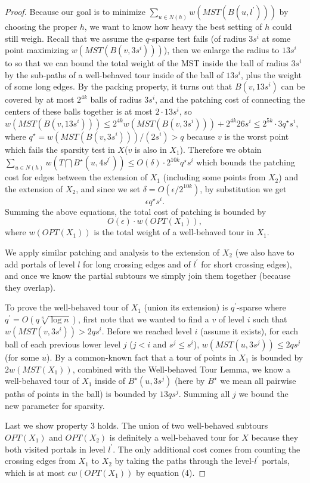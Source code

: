 \documentclass{llncs}
\begin{document}
\begin{proof}
Because our goal is to minimize $\sum_{u\in N(h)}w(MST(B(u,l^\prime)))$ by choosing the proper $h$, we want to know how heavy the best setting of $h$ could still weigh.
Recall that we assume the $q$-sparse test fails (of radius $3s^i$ at some point maximizing $w(MST(B(v,3s^i)))$), then we enlarge the radius to $13s^i$ to so that we can bound the total weight of the MST inside the ball of radius $3s^i$ by the sub-paths of a well-behaved tour inside of the ball of $13s^i$, plus the weight of some long edges.
By the packing property, it turns out that $B(v,13s^i)$ can be covered by at most $2^{4k}$ balls of radius $3s^i$, and the patching cost of connecting the centers of these balls together is at most $2\cdot13s^i$, so $w(MST(B(v,13s^i)))\leq 2^{4k}w(MST(B(v,3s^i)))+2^{4k}26s^i\leq 2^{5k}\cdot 3q^{\star}s^i$, where $q^\star=w(MST(B(v,3s^i)))/(2s^i) > q$ because $v$ is the worst point which fails the sparsity test in $X$($v$ is also in $X_1$).
Therefore we obtain $\sum_{u\in N(h)}w(T\bigcap B^\star(u,4s^{l^\prime}))\leq O(\delta)\cdot 2^{10k}q^\star s^i$ which bounds the patching cost for edges between the extension of $X_1$ (including some points from $X_2$) and the extension of $X_2$, and since we set $\delta=O(\epsilon/2^{10k})$, by substitution we get
\begin{equation}
\epsilon q^\star s^i.
\end{equation}
Summing the above equations, the total cost of patching is bounded by 
\begin{equation}
O(\epsilon)\cdot w(OPT(X_1)),
\end{equation}
where $w(OPT(X_1))$ is the total weight of a well-behaved tour in $X_1$.

We apply similar patching and analysis to the extension of $X_2$ (we also have to add portals of level $l$ for long crossing edges and of $l^\prime$ for short crossing edges), and once we know the partial subtours we simply join them together (because they overlap).

To prove the well-behaved tour of $X_1$ (union its extension) is $q^\prime$-sparse where $q^\prime=O(q\sqrt[8]{\log n})$, first note that we wanted to find a $v$ of level $i$ such that $w(MST(v,3s^i)) > 2qs^i$.
Before we reached level $i$ (assume it exists), for each ball of each previous lower level $j$ ($j<i$ and $s^j\leq s^i$), $w(MST(u,3s^j))\leq2qs^j$ (for some $u$).
By a common-known fact that a tour of points in $X_1$ is bounded by $2w(MST(X_1))$, combined with the Well-behaved Tour Lemma, we know a well-behaved tour of $X_1$ inside of $B^\star(u,3s^j)$ (here by $B^\star$ we mean all pairwise paths of points in the ball) is bounded by $13qs^j$.
Summing all $j$ we bound the new parameter for sparsity.

Last we show property 3 holds.
The union of two well-behaved subtours $OPT(X_1)$ and $OPT(X_2)$ is definitely a well-behaved tour for $X$ because they both visited portals in level $l^\prime$.
The only additional cost comes from counting the crossing edges from $X_1$ to $X_2$ by taking the paths through the level-$l^\prime$ portals, which is at most $\epsilon w(OPT(X_1))$ by equation (4).
\end{proof}
\end{document}
